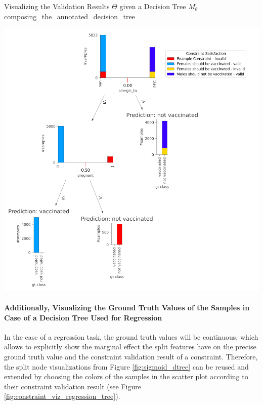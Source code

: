 \begin{Bsp}{Visualizing the Validation Results $\Theta$ given a Decision Tree $M_\theta$}{composing_the_annotated_decision_tree}
    \captionsetup{type=htypei}
    \begin{minipage}[]{\linewidth}
            \vspace{1ex}
            \centering
            \includegraphics[scale=.07]{images/visualizations/Annotated Decision Tree Multiple Constraints gt grouping.png}    
            \label{fig:multiple_constraints_gt_annotated_motivating_example_decision_tree}
    \end{minipage}
\end{Bsp}



\paragraph{Additionally, Visualizing the Ground Truth Values of the Samples in Case of a Decision Tree Used for Regression}

In the case of a regression task, the ground truth values will be continuous, which allows to explicitly show the marginal effect the split features have on the precise ground truth value and the constraint validation result of a constraint. Therefore, the split node visualizations from Figure \ref{fig:sigmoid_dtree} can be reused and extended by choosing the colors of the samples in the scatter plot according to their constraint validation result (see Figure \ref{fig:constraint_viz_regression_tree}). 

